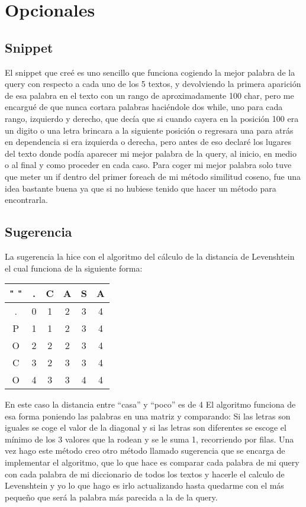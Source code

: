 \documentclass[a4paper,12pt]{article}
\begin{document}
\section{Opcionales}\label{sec:ent}
\subsection{Snippet}\label{sub:ent}

El snippet que creé es uno sencillo que funciona cogiendo la mejor palabra de la query con respecto a cada uno de los 5 textos, y devolviendo la primera aparición de esa palabra en el texto con un rango de aproximadamente 100 char, pero me encargué de que nunca cortara palabras haciéndole dos while, uno para cada rango, izquierdo y derecho, que decía que si cuando cayera en la posición 100 era un digito o una letra brincara a la siguiente posición o regresara una para atrás en dependencia si era izquierda o derecha, pero antes de eso declaré los lugares del texto donde podía aparecer mi mejor palabra de la query, al inicio, en medio o al final y como proceder en cada caso. 
Para coger mi mejor palabra solo tuve que meter un if dentro del primer foreach de mi método similitud coseno, fue una idea bastante buena ya que si no hubiese tenido que hacer un método para encontrarla. 



 \subsection{Sugerencia}\label{sub:ent}

 
La sugerencia la hice con el algoritmo del cálculo de la distancia de Levenshtein el cual funciona de la siguiente forma: 

\begin{center}
\begin{tabular}{cccccc}
\hline
 " "  & . & C & A & S & A \\
  \hline
  . & 0 & 1 & 2 & 3 & 4\\
\hline
  P & 1 & 1 & 2 & 3 & 4\\
\hline
O & 2 & 2 & 2 & 3 & 4\\
\hline
C & 3 & 2 & 3 & 3 & 4\\
\hline
O & 4 & 3 & 3 & 4 & 4\\
\hline
\end{tabular}
\end{center}

En este caso la distancia entre “casa” y “poco” es de 4 
El algoritmo funciona de esa forma poniendo las palabras en una matriz y comparando: 
Si las letras son iguales se coge el valor de la diagonal y si las letras son diferentes se escoge el mínimo de los 3 valores que la rodean y se le suma 1, recorriendo por filas. 
Una vez hago este método creo otro método llamado sugerencia que se encarga de implementar el algoritmo, que lo que hace es comparar cada palabra de mi query con cada palabra de mi diccionario de todos los textos y hacerle el calculo de Levenshtein y yo lo que hago es irlo actualizando hasta quedarme con el más pequeño que será la palabra más parecida a la de la query. 
 
\end{document}
